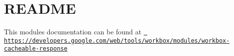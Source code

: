 \chapter{README}
\hypertarget{md_pkiclassroomrescheduler_2src_2main_2frontend_2node__modules_2workbox-cacheable-response_2_r_e_a_d_m_e}{}\label{md_pkiclassroomrescheduler_2src_2main_2frontend_2node__modules_2workbox-cacheable-response_2_r_e_a_d_m_e}
This module\textquotesingle{}s documentation can be found at \href{https://developers.google.com/web/tools/workbox/modules/workbox-cacheable-response}{\texttt{ https\+://developers.\+google.\+com/web/tools/workbox/modules/workbox-\/cacheable-\/response}} 